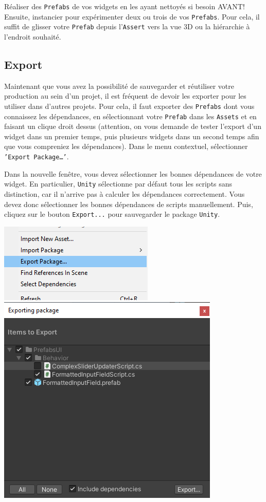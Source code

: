 \documentclass[a4paper,10pt]{article}
\begin{document}
Réaliser des \texttt{Prefabs} de vos widgets en les ayant nettoyés si besoin AVANT! Ensuite, instancier pour expérimenter deux ou trois de vos \texttt{Prefabs}. Pour cela, il suffit de glisser votre \texttt{Prefab} depuis l'\texttt{Assert} vers la vue 3D ou la hiérarchie à l'endroit souhaité.


\subsection{Export}

Maintenant que vous avez la possibilité de sauvegarder et réutiliser votre production au sein d'un projet, il est fréquent de devoir les exporter pour les utiliser dans d'autres projets. 
Pour cela, il faut exporter des \texttt{Prefabs} dont vous connaissez les dépendances, en sélectionnant votre \texttt{Prefab} dans les \texttt{Assets} et en faisant un clique droit dessus (attention, on vous demande de tester l'export d'un widget dans un premier temps, puis plusieurs widgets dans un second temps afin que vous compreniez les dépendances). Dans le menu contextuel, sélectionner \texttt{'Export Package\ldots'}.

Dans la nouvelle fenêtre, vous devez sélectionner les bonnes dépendances de votre widget. En particulier, \texttt{Unity} sélectionne par défaut tous les scripts sans distinction, car il n'arrive pas à calculer les dépendances correctement. Vous devez donc sélectionner les bonnes dépendances de scripts manuellement. Puis, cliquez sur le bouton \texttt{Export...} pour sauvegarder le package \texttt{Unity}.

\begin{center}
\hfill \includegraphics[width=0.35\linewidth]{rc/unity_set_ui_export_package}
\hfill \includegraphics[width=0.5\linewidth]{rc/unity_set_ui_export_prefab_deps}
\hfill 
\end{center}
\end{document}
